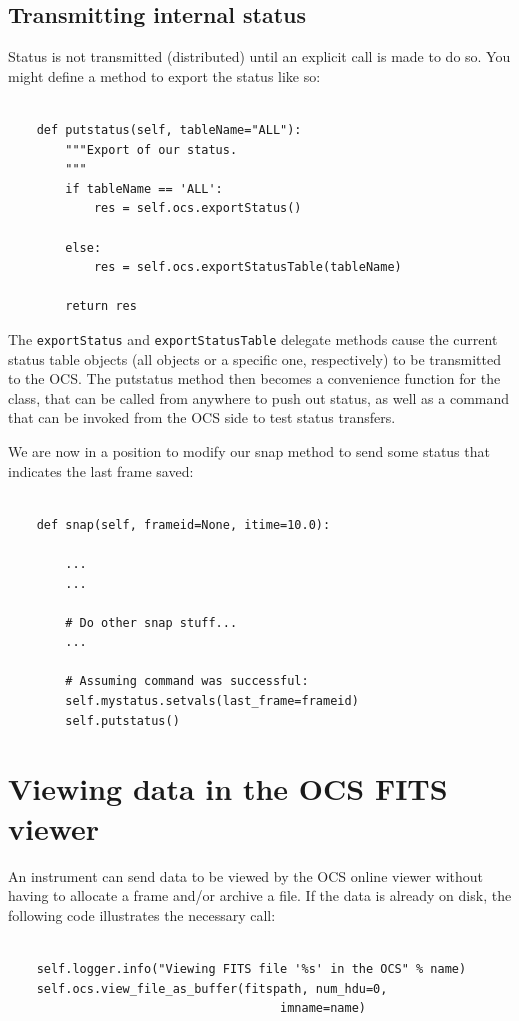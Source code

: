 \documentclass[11pt]{report}
\begin{document}
\subsection{Transmitting internal status}
Status is not transmitted (distributed) until an explicit call is made
to do so. You might define a method to export the status like so: 
\begin{verbatim}

    def putstatus(self, tableName="ALL"):
        """Export of our status.
        """
        if tableName == 'ALL':
            res = self.ocs.exportStatus()

        else:
            res = self.ocs.exportStatusTable(tableName)

        return res

\end{verbatim}
The {\tt exportStatus} and {\tt exportStatusTable} delegate methods
cause the current status table objects (all objects or a specific one,
respectively) to be transmitted to the OCS. The putstatus method then
becomes a convenience function for the class, that can be called from
anywhere to push out status, as well as a command that can be invoked
from the OCS side to test status transfers. 

We are now in a position to modify our snap method to send some status
that indicates the last frame saved: 
\begin{verbatim}

    def snap(self, frameid=None, itime=10.0):

        ...
        ...

        # Do other snap stuff...
        ...

        # Assuming command was successful:
        self.mystatus.setvals(last_frame=frameid)
        self.putstatus()

\end{verbatim}

\section{Viewing data in the OCS FITS viewer}
An instrument can send data to be viewed by the OCS online viewer
without having to allocate a frame and/or archive a file. If the data is
already on disk, the following code illustrates the necessary call: 
\begin{verbatim}

    self.logger.info("Viewing FITS file '%s' in the OCS" % name)
    self.ocs.view_file_as_buffer(fitspath, num_hdu=0,
                                      imname=name)
\end{verbatim}
\end{document}
